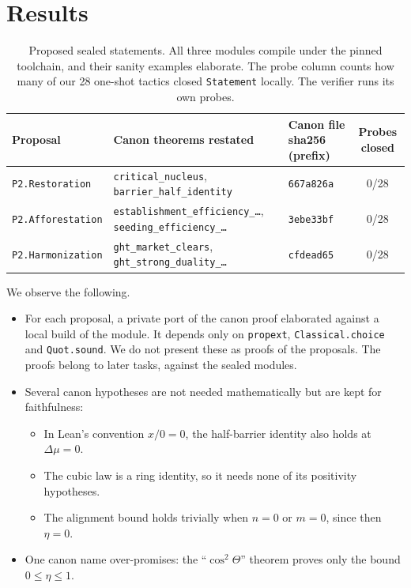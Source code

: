 \documentclass[11pt]{article}
\theoremstyle{definition}
\theoremstyle{remark}
\begin{document}
\section{Results}
\begin{table}[h]
\centering\small
\begin{tabular}{@{}p{}p{}lc@{}}
\toprule
Proposal & Canon theorems restated & Canon file sha256 (prefix) & Probes closed \\
\midrule
\texttt{P2.Restoration} & \texttt{critical\_nucleus}, \texttt{barrier\_half\_identity} & \texttt{667a826a} & 0/28 \\
\texttt{P2.Afforestation} & \texttt{establishment\_efficiency\_\ldots}, \texttt{seeding\_efficiency\_\ldots} & \texttt{3ebe33bf} & 0/28 \\
\texttt{P2.Harmonization} & \texttt{ght\_market\_clears}, \texttt{ght\_strong\_duality\_\ldots} & \texttt{cfdead65} & 0/28 \\
\bottomrule
\end{tabular}
\caption{Proposed sealed statements. All three modules compile under the pinned toolchain, and their sanity examples elaborate.
The probe column counts how many of our 28 one-shot tactics closed \texttt{Statement} locally. The verifier runs its own probes.}
\end{table}
We observe the following.
\begin{itemize}
\item For each proposal, a private port of the canon proof elaborated against a local build of the module.
It depends only on \texttt{propext}, \texttt{Classical.choice} and \texttt{Quot.sound}.
We do not present these as proofs of the proposals. The proofs belong to later tasks, against the sealed modules.
\item Several canon hypotheses are not needed mathematically but are kept for faithfulness:
\begin{itemize}
\item In Lean's convention $x/0=0$, the half-barrier identity also holds at $\Delta\mu=0$.
\item The cubic law is a ring identity, so it needs none of its positivity hypotheses.
\item The alignment bound holds trivially when $n=0$ or $m=0$, since then $\eta=0$.
\end{itemize}
\item One canon name over-promises: the ``$\cos^2\Theta$'' theorem proves only the bound $0\le\eta\le1$.
\end{itemize}
\end{document}
